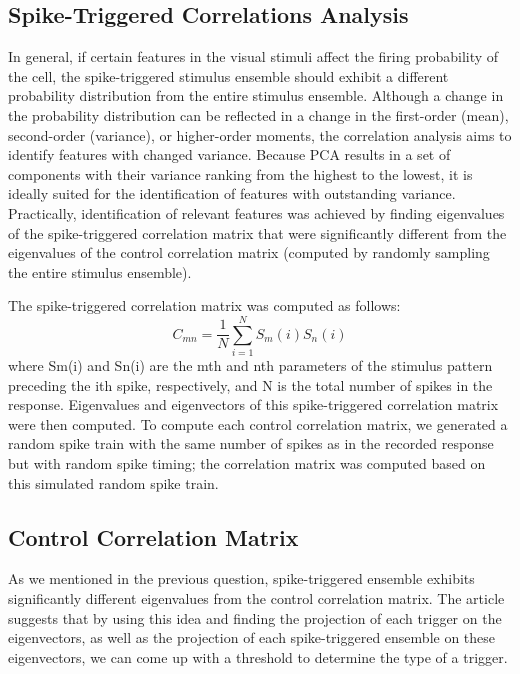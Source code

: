 \documentclass[12pt,a4paper,colorlinks=true]{article}
\begin{document}
	\subsection{Spike-Triggered Correlations Analysis} \label{S01_3}
	
	In general, if certain features in the visual stimuli affect the firing probability of the cell, the spike-triggered stimulus ensemble should exhibit a different probability distribution from the entire stimulus ensemble.
	Although a change in the probability distribution can be reflected in a change in the first-order (mean), second-order (variance), or higher-order moments, the correlation analysis aims to identify features with changed variance. Because PCA results in a set of components with their variance ranking from the highest to the lowest, it is ideally suited for the identification of features with outstanding variance. Practically, identification of relevant features was achieved by finding eigenvalues of the spike-triggered correlation matrix that were significantly different from the eigenvalues of the control correlation matrix (computed by randomly sampling the entire stimulus ensemble).
	
	\newpage
	
	The spike-triggered correlation matrix was computed as follows:
	$$C_{mn} = \frac{1}{N} \sum_{i=1}^{N} S_m(i) S_n(i)$$
	where Sm(i) and Sn(i) are the mth and nth parameters of the stimulus pattern preceding the ith spike, respectively, and N is the total number of spikes in the response.
	Eigenvalues and eigenvectors of this spike-triggered correlation matrix were then computed. To compute each control correlation matrix, we generated a random spike train with the same number of spikes as in the recorded response but with random spike timing; the correlation matrix was computed based on this simulated random spike train.
	
	\subsection{Control Correlation Matrix} \label{S01_4}
	
	As we mentioned in the previous question, spike-triggered ensemble exhibits significantly different eigenvalues from the control correlation matrix. The article suggests that by using this idea and finding the projection of each trigger on the eigenvectors, as well as the projection of each spike-triggered ensemble on these eigenvectors, we can come up with a threshold to determine the type of a trigger.
	
\end{document}
